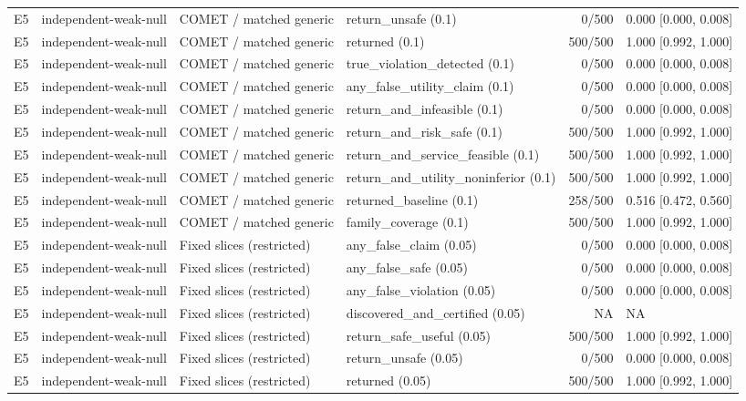 \begin{longtable}{p{.04\linewidth}p{.18\linewidth}p{.19\linewidth}p{.16\linewidth}r p{.21\linewidth}}
E5 & independent-weak-null & COMET / matched generic & return\_unsafe (0.1) & 0/500 & 0.000 [0.000, 0.008]\\
E5 & independent-weak-null & COMET / matched generic & returned (0.1) & 500/500 & 1.000 [0.992, 1.000]\\
E5 & independent-weak-null & COMET / matched generic & true\_violation\_detected (0.1) & 0/500 & 0.000 [0.000, 0.008]\\
E5 & independent-weak-null & COMET / matched generic & any\_false\_utility\_claim (0.1) & 0/500 & 0.000 [0.000, 0.008]\\
E5 & independent-weak-null & COMET / matched generic & return\_and\_infeasible (0.1) & 0/500 & 0.000 [0.000, 0.008]\\
E5 & independent-weak-null & COMET / matched generic & return\_and\_risk\_safe (0.1) & 500/500 & 1.000 [0.992, 1.000]\\
E5 & independent-weak-null & COMET / matched generic & return\_and\_service\_feasible (0.1) & 500/500 & 1.000 [0.992, 1.000]\\
E5 & independent-weak-null & COMET / matched generic & return\_and\_utility\_noninferior (0.1) & 500/500 & 1.000 [0.992, 1.000]\\
E5 & independent-weak-null & COMET / matched generic & returned\_baseline (0.1) & 258/500 & 0.516 [0.472, 0.560]\\
E5 & independent-weak-null & COMET / matched generic & family\_coverage (0.1) & 500/500 & 1.000 [0.992, 1.000]\\
E5 & independent-weak-null & Fixed slices (restricted) & any\_false\_claim (0.05) & 0/500 & 0.000 [0.000, 0.008]\\
E5 & independent-weak-null & Fixed slices (restricted) & any\_false\_safe (0.05) & 0/500 & 0.000 [0.000, 0.008]\\
E5 & independent-weak-null & Fixed slices (restricted) & any\_false\_violation (0.05) & 0/500 & 0.000 [0.000, 0.008]\\
E5 & independent-weak-null & Fixed slices (restricted) & discovered\_and\_certified (0.05) & NA & NA\\
E5 & independent-weak-null & Fixed slices (restricted) & return\_safe\_useful (0.05) & 500/500 & 1.000 [0.992, 1.000]\\
E5 & independent-weak-null & Fixed slices (restricted) & return\_unsafe (0.05) & 0/500 & 0.000 [0.000, 0.008]\\
E5 & independent-weak-null & Fixed slices (restricted) & returned (0.05) & 500/500 & 1.000 [0.992, 1.000]\\

\end{longtable}
